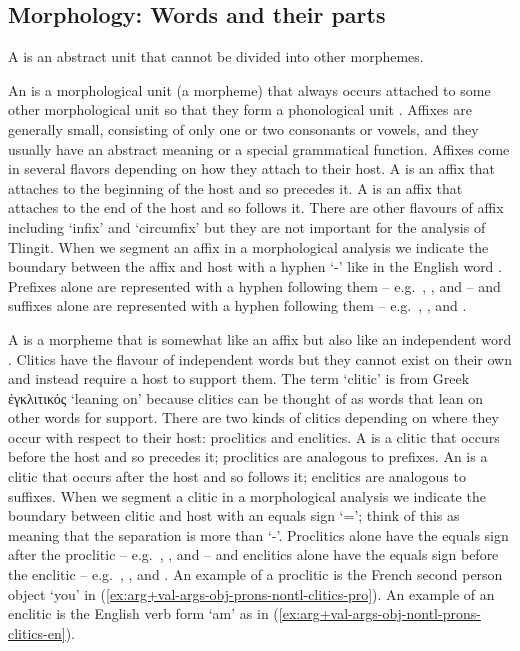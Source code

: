 
\subsection{Morphology: Words and their parts}\label{sec:intro-ling-morph}


A  is an abstract unit that cannot be divided into other morphemes.

An  is a morphological unit (a morpheme) that always occurs attached to some other morphological unit so that they form a phonological unit \parencite[9]{booij:2007}. Affixes are generally small, consisting of only one or two consonants or vowels, and they usually have an abstract meaning or a special grammatical function. Affixes come in several flavors depending on how they attach to their host. A  is an affix that attaches to the beginning of the host and so precedes it. A  is an affix that attaches to the end of the host and so follows it. There are other flavours of affix including ‘infix’ and ‘circumfix’ but they are not important for the analysis of Tlingit. When we segment an affix in a morphological analysis we indicate the boundary between the affix and host with a hyphen ‘-’ like in the English word . Prefixes alone are represented with a hyphen following them – e.g.\ , , and  – and suffixes alone are represented with a hyphen following them – e.g.\ , , and .

A  is a morpheme that is somewhat like an affix but also like an independent word \parencite[166]{booij:2007}. Clitics have the flavour of independent words but they cannot exist on their own and instead require a host to support them. The term ‘clitic’ is from Greek ἐγκλιτικός  ‘leaning on’ because clitics can be thought of as words that lean on other words for support. There are two kinds of clitics depending on where they occur with respect to their host: proclitics and enclitics. A  is a clitic that occurs before the host and so precedes it; proclitics are analogous to prefixes. An  is a clitic that occurs after the host and so follows it; enclitics are analogous to suffixes. When we segment a clitic in a morphological analysis we indicate the boundary between clitic and host with an equals sign ‘=’; think of this as meaning that the separation is more than ‘-’. Proclitics alone have the equals sign after the proclitic – e.g.\ , , and  – and enclitics alone have the equals sign before the enclitic – e.g.\ , , and . An example of a proclitic is the French second person object  ‘you’ in (\ref{ex:arg+val-args-obj-prons-nontl-clitics-pro}). An example of an enclitic is the English verb form  ‘am’ as in (\ref{ex:arg+val-args-obj-nontl-prons-clitics-en}).

